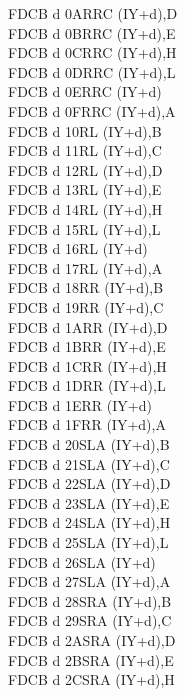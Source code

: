 \begin{multicols}{3}
{\begin{tabbing}
    FDCB d 0A\>RRC (IY+d),D\UNDOC\\
    FDCB d 0B\>RRC (IY+d),E\UNDOC\\
    FDCB d 0C\>RRC (IY+d),H\UNDOC\\
    FDCB d 0D\>RRC (IY+d),L\UNDOC\\
    FDCB d 0E\>RRC (IY+d)\\
    FDCB d 0F\>RRC (IY+d),A\UNDOC\\
    FDCB d 10\>RL (IY+d),B\UNDOC\\
    FDCB d 11\>RL (IY+d),C\UNDOC\\
    FDCB d 12\>RL (IY+d),D\UNDOC\\
    FDCB d 13\>RL (IY+d),E\UNDOC\\
    FDCB d 14\>RL (IY+d),H\UNDOC\\
    FDCB d 15\>RL (IY+d),L\UNDOC\\
    FDCB d 16\>RL (IY+d)\\
    FDCB d 17\>RL (IY+d),A\UNDOC\\
    FDCB d 18\>RR (IY+d),B\UNDOC\\
    FDCB d 19\>RR (IY+d),C\UNDOC\\
    FDCB d 1A\>RR (IY+d),D\UNDOC\\
    FDCB d 1B\>RR (IY+d),E\UNDOC\\
    FDCB d 1C\>RR (IY+d),H\UNDOC\\
    FDCB d 1D\>RR (IY+d),L\UNDOC\\
    FDCB d 1E\>RR (IY+d)\\
    FDCB d 1F\>RR (IY+d),A\UNDOC\\
    FDCB d 20\>SLA (IY+d),B\UNDOC\\
    FDCB d 21\>SLA (IY+d),C\UNDOC\\
    FDCB d 22\>SLA (IY+d),D\UNDOC\\
    FDCB d 23\>SLA (IY+d),E\UNDOC\\
    FDCB d 24\>SLA (IY+d),H\UNDOC\\
    FDCB d 25\>SLA (IY+d),L\UNDOC\\
    FDCB d 26\>SLA (IY+d)\\
    FDCB d 27\>SLA (IY+d),A\UNDOC\\
    FDCB d 28\>SRA (IY+d),B\UNDOC\\
    FDCB d 29\>SRA (IY+d),C\UNDOC\\
    FDCB d 2A\>SRA (IY+d),D\UNDOC\\
    FDCB d 2B\>SRA (IY+d),E\UNDOC\\
    FDCB d 2C\>SRA (IY+d),H\UNDOC\\

\end{tabbing}}
\end{multicols}
